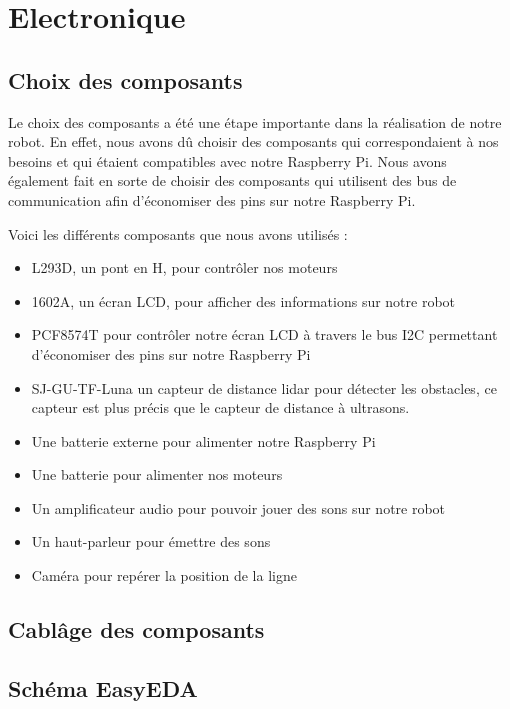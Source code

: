\section{Electronique}

\subsection{Choix des composants}

Le choix des composants a été une étape importante dans la réalisation de notre robot.
En effet, nous avons dû choisir des composants qui correspondaient à nos besoins et qui étaient compatibles avec notre Raspberry Pi. 
Nous avons également fait en sorte de choisir des composants qui utilisent des bus de communication afin d'économiser des pins sur notre Raspberry Pi.

Voici les différents composants que nous avons utilisés :
\begin{itemize}
    \item L293D, un pont en H, pour contrôler nos moteurs
    \item 1602A, un écran LCD, pour afficher des informations sur notre robot
    \item PCF8574T pour contrôler notre écran LCD à travers le bus I2C permettant d'économiser des pins sur notre Raspberry Pi
    \item SJ-GU-TF-Luna un capteur de distance lidar pour détecter les obstacles, ce capteur est plus précis que le capteur de distance à ultrasons.
    \item Une batterie externe pour alimenter notre Raspberry Pi
    \item Une batterie pour alimenter nos moteurs
    \item Un amplificateur audio pour pouvoir jouer des sons sur notre robot
    \item Un haut-parleur pour émettre des sons
    \item Caméra pour repérer la position de la ligne
\end{itemize}

\subsection{Cablâge des composants}

\todo

\subsection{Schéma EasyEDA}

\todo